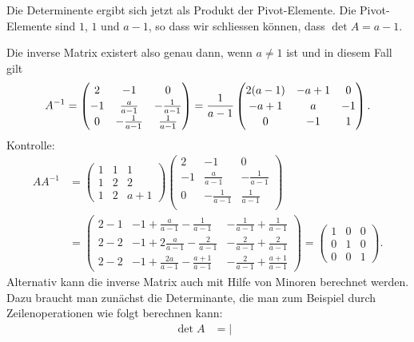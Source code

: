 \begin{loesung}
Die Determinente ergibt sich jetzt als Produkt der Pivot-Elemente.
Die Pivot-Elemente sind $1$, $1$ und $a-1$, so dass wir schliessen
können, dass $\det A=a-1$.

Die inverse Matrix existert also genau dann, wenn $a\ne 1$ ist und in diesem
Fall gilt
\[
A^{-1}
=
{
\renewcommand{\arraystretch}{1.15}
\begin{pmatrix}
 2&      -1     &            0\\
-1&\frac{a}{a-1}& -\frac1{a-1}\\
 0& -\frac1{a-1}&  \frac1{a-1}\\
\end{pmatrix}
}
=
\frac1{a-1}
\begin{pmatrix}
2(a-1)& -a+1 &  0\\
 -a+1 &  a   & -1\\
    0 &   -1 &  1
\end{pmatrix}.
\]
Kontrolle:
{
\renewcommand{\arraystretch}{1.15}
\begin{align*}
AA^{-1}
&=
\begin{pmatrix}
1&1&1\\
1&2&2\\
1&2&a+1
\end{pmatrix}
\begin{pmatrix}
 2&      -1     &            0\\
-1&\frac{a}{a-1}& -\frac1{a-1}\\
 0& -\frac1{a-1}&  \frac1{a-1}\\
\end{pmatrix}
\\
&=
\begin{pmatrix}
2-1 & -1+\frac{a}{a-1}-\frac{1}{a-1}   & -\frac1{a-1}+\frac1{a-1}     \\
2-2 & -1+2\frac{a}{a-1}-\frac{2}{a-1}  & -\frac{2}{a-1}+\frac{2}{a-1} \\
2-2 & -1+\frac{2a}{a-1}-\frac{a+1}{a-1}& -\frac2{a-1}+\frac{a+1}{a-1}
\end{pmatrix}
=
\begin{pmatrix}
1&0&0\\
0&1&0\\
0&0&1
\end{pmatrix}.
\end{align*}%
}%
Alternativ kann die inverse Matrix auch mit Hilfe von Minoren
berechnet werden.
Dazu braucht man zunächst die Determinante, die man zum Beispiel
durch Zeilenoperationen wie folgt berechnen kann:
\begin{align*}
\det A
&=
\left|\begin{matrix}

\end{matrix}
\end{align*}
\end{loesung}
